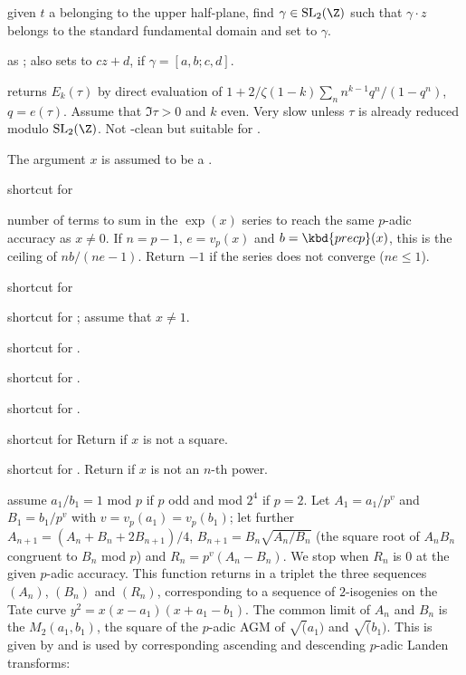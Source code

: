 
 given $t$ a  belonging to the
upper half-plane, find $\gamma \in \text{SL}_2(\Z)$ such that $\gamma \cdot z$
belongs to the standard fundamental domain and set  to $\gamma$.

 as ; also sets
 to $cz + d$, if $\gamma = [a,b;c,d]$.

 returns $E_k(\tau)$ by direct
evaluation of $1 + 2/\zeta(1-k) \sum_n n^{k-1} q^n/(1-q^n)$, $q = e(\tau)$.
Assume that $\Im \tau > 0$ and $k$ even. Very slow unless $\tau$ is already
reduced modulo $\text{SL}_2(\Z)$. Not -clean but suitable for
.


The argument $x$ is assumed to be a .

 shortcut for 

 number of terms to sum in the $\exp(x)$
series to reach the same $p$-adic accuracy as $x\neq 0$. If $n = p-1$, $e =
v_p(x)$ and $b = \kbd{precp}(x)$, this is the ceiling of $nb / (ne - 1)$.
Return $-1$ if the series does not converge ($ne \leq 1$).

 shortcut for 

 shortcut for ;
assume that $x\neq 1$.

 shortcut for
 .

 shortcut for
 .

 shortcut for .

 shortcut for 
Return  if $x$ is not a square.

 shortcut for . Return  if $x$ is not an $n$-th power.

 assume $a_1/b_1 = 1$ mod $p$
if $p$ odd and mod $2^4$ if $p = 2$. Let $A_1 = a_1/p^v$ and $B_1 = b_1/p^v$
with $v = v_p(a_1) = v_p(b_1)$; let further
$A_{n+1} = (A_n + B_n + 2 B_{n+1}) / 4$,
$B_{n+1} = B_n \sqrt{A_n / B_n}$ (the square root of $A_n B_n$ congruent to
$B_n$ mod $p$) and $R_n = p^v(A_n - B_n)$. We stop when $R_n$ is $0$
at the given $p$-adic accuracy. This function returns in a triplet 
the three sequences $(A_n)$, $(B_n)$ and $(R_n)$, corresponding to a sequence
of $2$-isogenies on the Tate curve $y^2 = x(x-a_1)(x+a_1-b_1)$. The
common limit of $A_n$ and $B_n$ is the $M_2(a_1,b_1)$, the square
of the $p$-adic AGM of $\sqrt(a_1)$ and $\sqrt(b_1)$. This is given
by  and is used by corresponding ascending and descending
$p$-adic Landen transforms:

